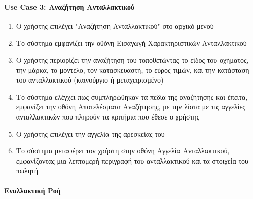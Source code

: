 \documentclass{../ol-softwaremanual}
\begin{document}
	\paragraph{}
	
	
	
	
	\paragraph{\en Use Case 3: \gr Αναζήτηση Ανταλλακτικού}	
	
	\begin{enumerate}
		\item Ο χρήστης επιλέγει \en"\gr Αναζήτηση Ανταλλακτικού\en" \gr στο αρχικό μενού
		\item Το σύστημα εμφανίζει την οθόνη Εισαγωγή Χαρακτηριστικών Ανταλλακτικού
		\item Ο χρήστης περιορίζει την αναζήτηση του τοποθετώντας το είδος του οχήματος, την μάρκα, το μοντέλο, τον κατασκευαστή, το εύρος τιμών, και την κατάσταση του ανταλλακτικού (καινούργιο ή μεταχειρισμένο) 
		\item Το σύστημα ελέγχει πως συμπληρώθηκαν τα πεδία της αναζήτησης και έπειτα, εμφανίζει την οθόνη Αποτελέσματα Αναζήτησης, με την λίστα με τις αγγελίες ανταλλακτικών που πληρούν τα κριτήρια που έθεσε ο χρήστης
		\item Ο χρήστης επιλέγει την αγγελία της αρεσκείας του
		\item Το σύστημα μεταφέρει τον χρήστη στην οθόνη Αγγελία Ανταλλακτικού, εμφανίζοντας μια λεπτομερή περιγραφή του ανταλλακτικού και τα στοιχεία του πωλητή		
	\end{enumerate}
	
	\paragraph{Εναλλακτική Ροή}
	
\end{document}
